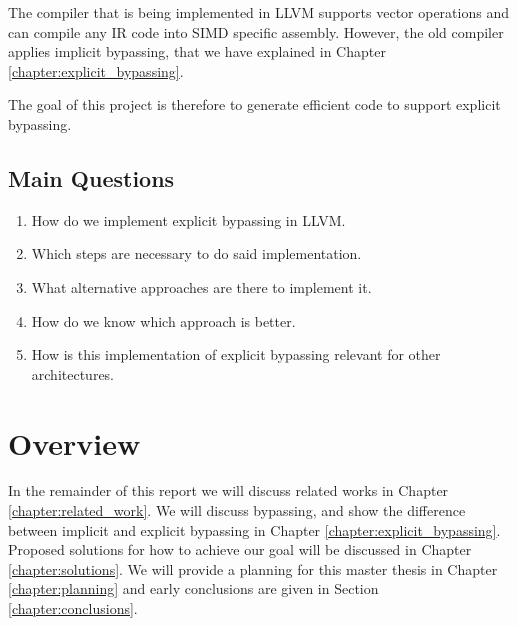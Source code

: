 The compiler that is being implemented in LLVM supports vector operations and can compile any IR code into SIMD specific assembly. However, the old compiler applies implicit bypassing, that we have explained in Chapter \ref{chapter:explicit_bypassing}.

The goal of this project is therefore to generate efficient code to support explicit bypassing.

\subsection{Main Questions}

\begin{enumerate}
\item How do we implement explicit bypassing in LLVM.
\item Which steps are necessary to do said implementation.
\item What alternative approaches are there to implement it.
\item How do we know which approach is better.
\item How is this implementation of explicit bypassing relevant for other architectures. 
\end{enumerate}





\section{Overview}
In the remainder of this report we will discuss related works in Chapter \ref{chapter:related_work}. We will discuss bypassing, and show the difference between implicit and explicit bypassing in Chapter \ref{chapter:explicit_bypassing}. Proposed solutions for how to achieve our goal will be discussed in Chapter \ref{chapter:solutions}. We will provide a planning for this master thesis in Chapter \ref{chapter:planning} and early conclusions are given in Section \ref{chapter:conclusions}.